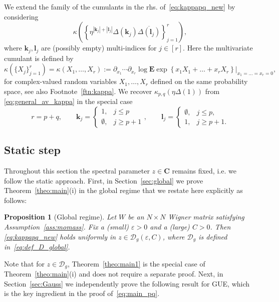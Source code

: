 \documentclass[10pt]{amsart}
\newtheorem{proposition}[theorem]{Proposition}
\numberwithin{equation}{section}
\newcommand{\E}{\mathbf{E}}
\newcommand{\C}{\mathbf{C}}
\begin{document}
We extend the family of the cumulants in the rhs. of~\eqref{eq:kappapq_new} by considering
\begin{equation}
\kappa\left(\left\lbrace \eta^{|\bm{k}_j|+|\bm{l}_j|}\Delta(\bm{k}_j)\overline{\Delta(\bm{l}_j)}\right\rbrace_{j=1}^r\right),
\label{eq:general_av_kappa}
\end{equation}
where $\bm{k}_j,\bm{l}_j$ are (possibly empty) multi-indices for $j\in[r]$. Here the multivariate cumulant is defined by
\begin{equation}
\kappa\left(\lbrace X_j\rbrace_{j=1}^r\right)=\kappa\left(X_1,\ldots,X_r\right):=\partial_{x_1}\cdots\partial_{x_r} \log \E \exp\left\lbrace x_1X_1+\ldots + x_rX_r\right\rbrace \Big|_{x_1=\ldots=x_r=0},
\label{eq:def_cum}
\end{equation}
for complex-valued random variables $X_1,\ldots,X_r$ defined on the same probability space, see also Footnote~\ref{ftn:kappa}. We recover $\kappa_{p,q}\left(\eta\Delta(1)\right)$ from \eqref{eq:general_av_kappa} in the special case
\begin{equation}
r=p+q,\qquad \bm{k}_j=\begin{cases}
1,& j\le p\\
\emptyset,& j\ge p+1
\end{cases},\qquad
\bm{l}_j=\begin{cases}
\emptyset,& j\le p,\\
1,& j\ge p+1.
\end{cases} 
\end{equation} 


\subsection{Static step}\label{sec:strategy_Gauss} Throughout this section the spectral parameter $z\in \C$ remains fixed, i.e. we follow the static approach. First, in Section~\ref{sec:global} we prove Theorem~\ref{theo:main}(i) in the global regime that we restate here explicitly as follows:

\begin{proposition}[Global regime]\label{prop:global} Let $W$ be an $N\times N$ Wigner matrix satisfying Assumption~\ref{ass:momass}. Fix a (small) $\varepsilon>0$ and a (large) $C>0$. Then \eqref{eq:kappapq_new} holds uniformly in $z\in\mathcal{D}_g(\varepsilon,C)$, where $\mathcal{D}_g$ is defined in~\eqref{eq:def_D_global}.
\end{proposition}

Note that for $z\in\mathcal{D}_g$, Theorem~\ref{theo:main1} is the special case of Theorem~\ref{theo:main}(i) and does not require a separate proof. Next, in Section~\ref{sec:Gauss} we independently prove the following result for GUE, which is the key ingredient in the proof of~\eqref{eq:main_pq}.
\end{document}
